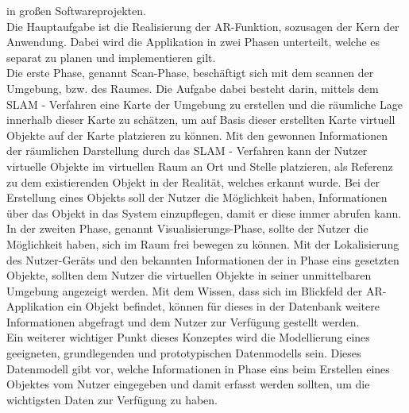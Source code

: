 in großen Softwareprojekten.
\\
\linebreak
Die Hauptaufgabe ist die Realisierung der \acl{AR}-Funktion, sozusagen der Kern der Anwendung. Dabei wird die Applikation in zwei 
Phasen unterteilt, welche es separat zu planen und implementieren gilt.
\\ 
\linebreak
Die erste Phase, genannt Scan-Phase, beschäftigt sich mit dem scannen der Umgebung, bzw. des Raumes. Die Aufgabe dabei besteht darin, 
mittels dem \ac{SLAM} - Verfahren eine Karte der Umgebung zu erstellen und die räumliche Lage innerhalb dieser Karte zu schätzen, um 
auf Basis dieser erstellten Karte virtuell Objekte auf der Karte platzieren zu können. Mit den gewonnen Informationen der räumlichen 
Darstellung durch das \acs{SLAM} - Verfahren kann der Nutzer virtuelle Objekte im virtuellen Raum an Ort und Stelle platzieren, als 
Referenz zu dem existierenden Objekt in der Realität, welches erkannt wurde. Bei der Erstellung eines Objekts soll der Nutzer die 
Möglichkeit haben, Informationen über das Objekt in das System einzupflegen, damit er diese immer abrufen kann. 
\\ 
\linebreak
In der zweiten Phase, genannt Visualisierungs-Phase, sollte der Nutzer die Möglichkeit haben, sich im Raum frei bewegen zu können. 
Mit der Lokalisierung des Nutzer-Geräts und den bekannten Informationen der in Phase eins gesetzten Objekte, sollten dem Nutzer 
die virtuellen Objekte in seiner unmittelbaren Umgebung angezeigt werden. Mit dem Wissen, dass sich im Blickfeld der \acs{AR}-Applikation 
ein Objekt befindet, können für dieses in der Datenbank weitere Informationen abgefragt und dem Nutzer zur Verfügung gestellt werden.
\\ 
\linebreak
Ein weiterer wichtiger Punkt dieses Konzeptes wird die Modellierung eines geeigneten, grundlegenden und prototypischen Datenmodells sein. 
Dieses Datenmodell gibt vor, welche Informationen in Phase eins beim Erstellen eines Objektes vom Nutzer eingegeben und damit erfasst 
werden sollten, um die wichtigsten Daten zur Verfügung zu haben. 

